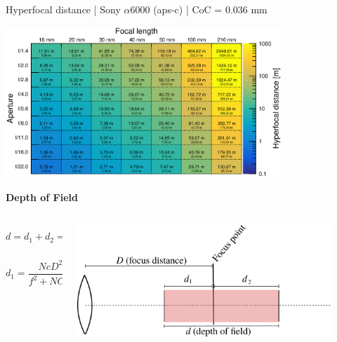 \documentclass[aspectratio=169]{beamer}
\begin{document}
\begin{frame}[plain]{}
  \vspace{1ex}
  \centering
  Hyperfocal distance | Sony $\alpha$\hspace{0.1em}6000 (aps-c) | CoC = 0.036 mm

  \includegraphics[center,width=0.78\textwidth]{img/hyperfocal-distance.eps}
\end{frame}


\begin{frame}[plain]{}
  \vspace{3ex}
  \begin{center} \LARGE \bf
    Depth of Field
  \end{center}

  \begin{columns}
  \begin{column}{0.40\textwidth}
  {\Large 
    $$\mathit{d = d_1 + d_2 = \frac{2NcD^2f^2}{f^4 - N^2c^2D^2}}$$
  }

  \vspace{2ex}
  {\scriptsize
    $$\mathit{d_1 = \frac{NcD^2}{f^2 + NCD}}, \, \, \, \mathit{d_2 = \frac{NcD^2}{f^2 - NCD}}$$
  }
  \end{column}
  \begin{column}{0.60\textwidth}
    \center
    \includegraphics[width=0.90\textwidth]{img/lensfocus-dof.pdf}
  \end{column}
  \end{columns}

\end{frame}
\end{document}
